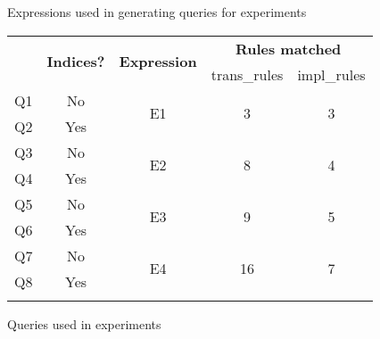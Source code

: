 \begin{centeredfigure*}
\begin{minipage}[b]{9.1cm}
\myshadowbox{
\begin{minipage}[b]{8.6cm}
\subfigure[E1] { \usebox{\Eone} \label{fig:Eone} }
\vrule
\subfigure[E2] { \usebox{\Etwo} \label{fig:Etwo} }
\vrule
\subfigure[E3] { \usebox{\Ethree} \label{fig:Ethree} }
\vrule
\subfigure[E4] { \usebox{\Efour} \label{fig:Efour} }
\normalsize
\end{minipage}
}
\caption{Expressions used in generating queries for experiments}
\label{fig:exps}
\end{minipage}
\hfill
\begin{minipage}[b]{7.0cm}
\setcounter{savectr}{\value{figure}}
\renewcommand{\figurename}{\tablename}
\setcounter{figure}{\value{table}}
\scriptsize
\renewcommand{\multirowsetup}{\centering}
\newlength{\Lone}
\settowidth{\Lone}{E4}
\newlength{\Ltwo}
\newlength{\Lthree}
\newlength{\Lfour}
\newlength{\Lnum}
\settowidth{\Lnum}{99}
\begin{tabular}{|c|c|c|c|c|} \thickhline
\multirow{2}{\Ltwo}{\textbf{Query}}
  & \multirow{2}{\Lthree}{\textbf{Indices?}}
  & \multirow{2}{\Lfour}{\textbf{Expression}} 
  & \multicolumn{2}{c|}{\textbf{Rules matched}} \\ \cline{4-5}
& & & trans\_rules & impl\_rules \\ \thickhline
Q1 & No & \multirow{2}{\Lone}{E1} & \multirow{2}{\Lnum}{3}
  & \multirow{2}{\Lnum}{3} \\ \cline{1-2}
Q2 & Yes & & & \\ \hline
Q3 & No & \multirow{2}{\Lone}{E2} & \multirow{2}{\Lnum}{8}
  & \multirow{2}{\Lnum}{4} \\ \cline{1-2}
Q4 & Yes & & & \\ \hline
Q5 & No & \multirow{2}{\Lone}{E3} & \multirow{2}{\Lnum}{9}
  & \multirow{2}{\Lnum}{5} \\ \cline{1-2}
Q6 & Yes & & & \\ \hline
Q7 & No & \multirow{2}{\Lone}{E4} & \multirow{2}{\Lnum}{16}
  & \multirow{2}{\Lnum}{7} \\ \cline{1-2}
Q8 & Yes & & & \\ \thickhline
\end{tabular}
\caption{Queries used in experiments}
\label{tab:queries}
\renewcommand{\figurename}{Figure}
\setcounter{figure}{\value{savectr}}
\end{minipage}
\end{centeredfigure*}

